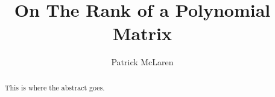 \documentclass{amsart}
\theoremstyle{definition}
\theoremstyle{remark}
\numberwithin{equation}{section}
\begin{document}
\title{On The Rank of a Polynomial Matrix}
\author{Patrick McLaren}

\begin{abstract}
This is where the abstract goes.
\end{abstract}

\maketitle
\end{document}
